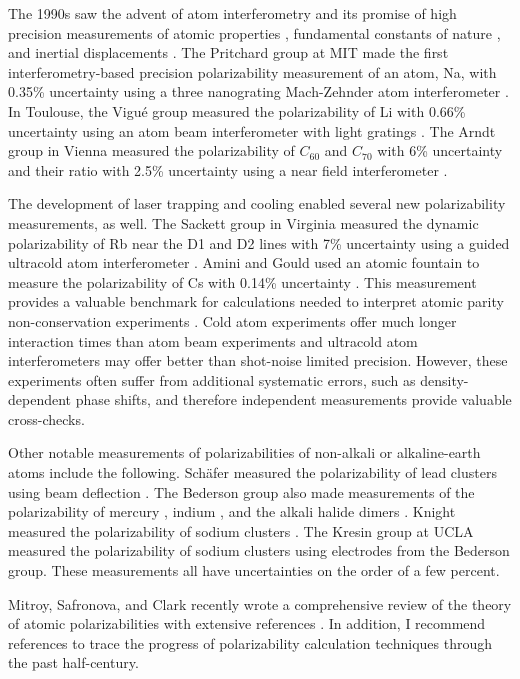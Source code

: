 The 1990s saw the advent of atom interferometry and its promise of high precision measurements of atomic properties \cite{Eks95, Mif06, Lep11a}, fundamental constants of nature \cite{Fix07}, and inertial displacements \cite{Len97, Gus97}. The Pritchard group at MIT made the first interferometry-based precision polarizability measurement of an atom, Na, with 0.35\% uncertainty using a three nanograting Mach-Zehnder atom interferometer \cite{Eks95}. In Toulouse, the Vigu\'{e} group measured the polarizability of Li with 0.66\% uncertainty using an atom beam interferometer with light gratings \cite{Mif06}. The Arndt group in Vienna measured the polarizability of $C_{60}$ and $C_{70}$ with 6\% uncertainty and their ratio with 2.5\% uncertainty using a near field interferometer \cite{Ber07}. 

The development of laser trapping and cooling enabled several new polarizability measurements, as well. The Sackett group in Virginia measured the dynamic polarizability of Rb near the D1 and D2 lines with 7\% uncertainty using a guided ultracold atom interferometer \cite{Dei08}. Amini and Gould used an atomic fountain to measure the polarizability of Cs with 0.14\% uncertainty \cite{Ami03}. This measurement provides a valuable benchmark for calculations \cite{Der07, Por09} needed to interpret atomic parity non-conservation experiments \cite{Woo97}. Cold atom experiments offer much longer interaction times than atom beam experiments and ultracold atom interferometers may offer better than shot-noise limited precision. However, these experiments often suffer from additional systematic errors, such as density-dependent phase shifts, and therefore independent measurements provide valuable cross-checks. 

Other notable measurements of polarizabilities of non-alkali or alkaline-earth atoms include the following. Sch\"{a}fer \etal measured the polarizability of lead clusters using beam deflection \cite{Sch08}. The Bederson group also made measurements of the polarizability of mercury \cite{Lev68}, indium \cite{Gue84}, and the alkali halide dimers \cite{Gue91}. Knight \etal measured the polarizability of sodium clusters \cite{Kni85}. The Kresin group at UCLA measured the polarizability of sodium clusters \cite{Tik01} using 
electrodes from the Bederson group. These measurements all have uncertainties on the order of a few percent.

Mitroy, Safronova, and Clark recently wrote a comprehensive review of the theory of atomic polarizabilities with extensive references \cite{Mit10}. In addition, I recommend references \cite{Dal62,Rei76,Mul84,Der99,Saf99,Lim05atoms,Saf06} to trace the progress of polarizability calculation techniques through the past half-century. 

